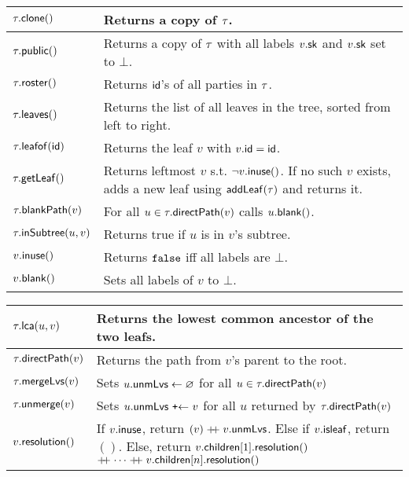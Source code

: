 \begin{table*}[!t]
  \begin{minipage}{\textwidth}
  	\begin{tabularx}{.48\textwidth}{| l | X |}
  		\hline
  		$\tau.{\mathsf{clone}}()$ & Returns a copy of $\tau$.\\
  		\hline
  		$\tau.{\mathsf{public}}()$ & Returns a copy of $\tau$ with all labels $v.{\mathsf{sk}}$ and $v.\mathsf{sk}$ set to $\bot$.\\
  		\hline
  		$\tau.{\mathsf{roster}}()$ & Returns ${\mathsf{id}}$'s of all parties in $\tau$.\\
  		\hline
  		$\tau.{\mathsf{leaves}}()$ & Returns the list of all leaves in the tree, sorted from left to right.\\
  		\hline
  		$\tau.{\mathsf{leafof}}({\mathsf{id}})$ & Returns the leaf $v$ with $v.{\mathsf{id}} = {\mathsf{id}}$.\\
  		\hline
  		$\tau.{\mathsf{getLeaf}}()$ & Returns leftmost $v$ s.t. $\neg v.{\mathsf{inuse}}()$. If no such $v$ exists, adds a new leaf using ${\mathsf{addLeaf}}(\tau)$ and returns it.\\
      \hline
      $\tau.{\mathsf{blankPath}}(v)$ & For all $u\in\tau.{\mathsf{directPath}}(v)$ calls $u.{\mathsf{blank}}()$. \\
      \hline
  		$\tau.{\mathsf{inSubtree}}(u,v)$ & Returns true if $u$ is in $v$'s subtree.\\
  		\hline
  		$v.{\mathsf{inuse}}()$ & Returns ${\normalfont\texttt{false}}$ iff all labels are $\bot$.\\
  		\hline
  		$v.{\mathsf{blank}}()$ & Sets all labels of $v$ to $\bot$.\\
  		\hline
  	\end{tabularx}
    \hfill
    \begin{tabularx}{.48\textwidth}{| l | X |}
  		\hline
  		$\tau.{\mathsf{lca}}(u, v)$ & Returns the lowest common ancestor of the two leafs.\\
  		\hline
  		$\tau.{\mathsf{directPath}}(v)$ & Returns the path from $v$'s parent to the root.\\
  		\hline
  		$\tau.{\mathsf{mergeLvs}}(v)$ & Sets $u.{\mathsf{unmLvs}} \gets \varnothing$ for all $u \in
                                    \tau.{\mathsf{directPath}}(v)$\\
  		\hline
  		$\tau.{\mathsf{unmerge}}(v)$ & Sets $u.{\mathsf{unmLvs}} \ \texttt{+$\gets$}\  v$ for all $u$ returned by $\tau.{\mathsf{directPath}}(v)$\\
  		\hline
      $v.{\mathsf{resolution}}()$ &
      If $v.{\mathsf{inuse}}$, return $(v) \mathrel{+\!\!+} v.{\mathsf{unmLvs}}$. Else if $v.{\mathsf{isleaf}}$, return $()$. Else, return $v.{\mathsf{children}}[1].{\mathsf{resolution}}() $ $\append \dots \append v.\children[n].\resolution()$\\

\end{tabularx}
\end{minipage}
\end{table*}
